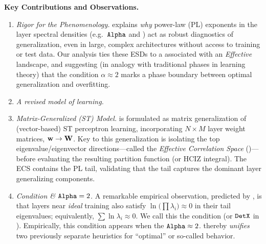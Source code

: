 \vspace{1em}
\noindent
\textbf{Key Contributions and Observations.}
\begin{enumerate}[label=\Alph*.]
\item 
\emph{Rigor for the \HTSR Phenomenology.}
\SETOL explains \emph{why} power-law (PL) exponents in the layer spectral densities (e.g.\ $\texttt{Alpha}$ and 
\ALPHAHAT) act as robust diagnostics of generalization, even in large, complex architectures without access 
to training or test data. Our analysis ties these \HeavyTailed ESDs to a \VolumePreservingTransformation
associated with an \emph{Effective} \FreeEnergy landscape, and
suggesting (in analogy with traditional \STATMECH phases in learning theory)
that the \HTSR condition $\alpha\approx 2$ marks a
phase boundary between optimal generalization and overfitting.

\item
\emph{A revised \StudentTeacher model of learning.}

\item 
\emph{Matrix-Generalized \StudentTeacher (ST) Model.}
\SETOL is formulated as matrix generalization of
 (vector-based) ST perceptron learning, incorporating $N\times M$ layer 
weight matrices, ${\mathbf{w}}\rightarrow{\mathbf{W}}$.
Key to this generalization is isolating the top eigenvalue/eigenvector directions---called the
\emph{Effective Correlation Space} (\ECS)---before evaluating the resulting partition function (or HCIZ 
integral). The ECS contains the \HTSR PL tail, validating that the tail captures the dominant layer generalizing components.

\item 
\emph{\TRACELOG Condition \& $\texttt{Alpha}=2$.}
A remarkable empirical observation, predicted by \SETOL, is that layers near \emph{ideal} training also satisfy 
$\ln\!\bigl(\prod \lambda_i \bigr) \approx 0$ in their tail eigenvalues; equivalently, $\sum \ln\lambda_i \approx 0$.
We call this the \TRACELOG condition (or $\texttt{DetX}$ in \WW).
Empirically, this condition appears when the \HTSR $\texttt{Alpha} \approx 2$. \SETOL thereby \emph{unifies} two 
previously separate heuristics for “optimal” or so-called \Ideal  behavior.


\end{enumerate}
